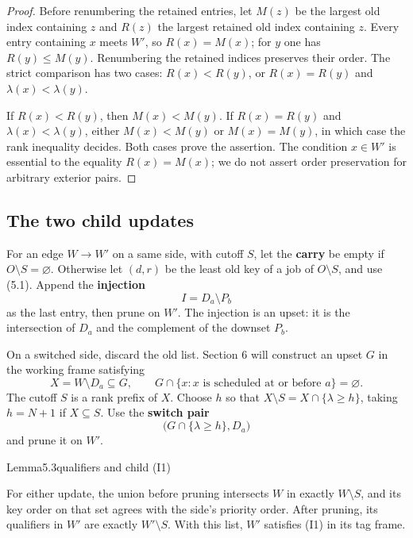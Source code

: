 \begin{proof}
Before renumbering the retained entries, let \(M(z)\) be the largest old index containing \(z\) and \(R(z)\) the largest retained old index containing \(z\). Every entry containing \(x\) meets \(W'\), so \(R(x)=M(x)\); for \(y\) one has \(R(y)\leq M(y)\). Renumbering the retained indices preserves their order. The strict comparison has two cases: \(R(x)<R(y)\), or \(R(x)=R(y)\) and \(\lambda(x)<\lambda(y)\).

If \(R(x)<R(y)\), then \(M(x)<M(y)\). If \(R(x)=R(y)\) and \(\lambda(x)<\lambda(y)\), either \(M(x)<M(y)\) or \(M(x)=M(y)\), in which case the rank inequality decides. Both cases prove the assertion. The condition \(x\in W'\) is essential to the equality \(R(x)=M(x)\); we do not assert order preservation for arbitrary exterior pairs.
\end{proof}

\subsection{The two child updates}

For an edge \(W\to W'\) on a same side, with cutoff \(S\), let the \textbf{carry} be empty if \(O\setminus S=\varnothing\). Otherwise let \((d,r)\) be the least old key of a job of \(O\setminus S\), and use (5.1). Append the \textbf{injection} \[
I=D_a\setminus P_b
\tag{5.2}
\] as the last entry, then prune on \(W'\). The injection is an upset: it is the intersection of \(D_a\) and the complement of the downset \(P_b\).

On a switched side, discard the old list. Section 6 will construct an upset \(G\) in the working frame satisfying \[
X=W\setminus D_a\subseteq G,\qquad
G\cap\{x:x\text{ is scheduled at or before }a\}=\varnothing.
\tag{5.3}
\] The cutoff \(S\) is a rank prefix of \(X\). Choose \(h\) so that \(X\setminus S=X\cap\{\lambda\geq h\}\), taking \(h=N+1\) if \(X\subseteq S\). Use the \textbf{switch pair} \[
\bigl(G\cap\{\lambda\geq h\},D_a\bigr)
\tag{5.4}
\] and prune it on \(W'\).

\begin{numbered}{Lemma}{5.3}{qualifiers and child (I1)}

For either update, the union before pruning intersects \(W\) in exactly \(W\setminus S\), and its key order on that set agrees with the side's priority order. After pruning, its qualifiers in \(W'\) are exactly \(W'\setminus S\). With this list, \(W'\) satisfies (I1) in its tag frame.

\end{numbered}


